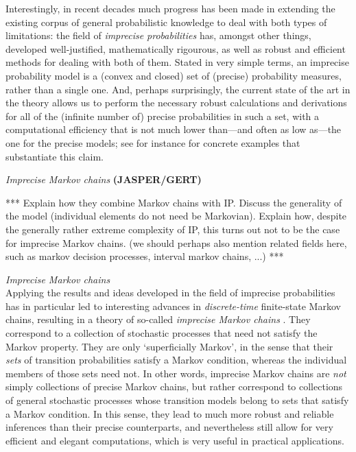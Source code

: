 \documentclass[11pt,dvipsnames,usenames,a4paper]{article}
\begin{document}
Interestingly, in recent decades much progress has been made in extending the existing corpus of general probabilistic knowledge to deal with both types of limitations: the field of \emph{imprecise probabilities} \cite{walley1991,augustin2013:itip,troffaes2013:lp} has, amongst other things, developed well-justified, mathematically rigourous, as well as robust and efficient methods for dealing with both of them.
Stated in very simple terms, an imprecise probability model is a (convex and closed) set of (precise) probability measures, rather than a single one.
And, perhaps surprisingly, the current state of the art in the theory allows us to perform the necessary robust calculations and derivations for all of the (infinite number of) precise probabilities in such a set, with a computational efficiency that is not much lower than---and often as low as---the one for the precise models; see for instance \cite{cooman2009,debock2014:estihmm,debock2015:thesis,cooman2008} for concrete examples that substantiate this claim.


\emph{Imprecise Markov chains} {\bf\color{blue} (JASPER/GERT)}

*** Explain how they combine Markov chains with IP. 
Discuss the generality of the model (individual elements do not need be Markovian).
Explain how, despite the generally rather extreme complexity of IP, this turns out not to be the case for imprecise Markov chains. (we should perhaps also mention related fields here, such as markov decision processes, interval markov chains, ...) ***


\vspace{5pt}
\emph{Imprecise Markov chains}\\[5pt]
Applying the results and ideas developed in the field of imprecise probabilities has in particular led to interesting advances in \emph{discrete-time} finite-state Markov chains, resulting in a theory of so-called \emph{imprecise Markov chains} \cite{cooman2008,hermans2012,hartfiel1998,skulj2013,cooman2015:isipta:markov,cooman2015:markovergodic}.
They correspond to a collection of stochastic processes that need not satisfy the Markov property.
They are only `superficially Markov', in the sense that their \emph{sets} of transition probabilities satisfy a Markov condition, whereas the individual members of those sets need not.
In other words, imprecise Markov chains are \emph{not} simply collections of precise Markov chains, but rather correspond to collections of general stochastic processes whose transition models belong to sets that satisfy a Markov condition.
In this sense, they lead to much more robust and reliable inferences than their precise counterparts, and nevertheless still allow for very efficient and elegant computations, which is very useful in practical applications.
\end{document}
